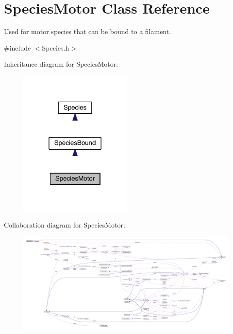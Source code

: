 \hypertarget{classSpeciesMotor}{\section{Species\+Motor Class Reference}
\label{classSpeciesMotor}
}


Used for motor species that can be bound to a filament.  




{\ttfamily \#include $<$Species.\+h$>$}



Inheritance diagram for Species\+Motor\+:\nopagebreak
\begin{figure}[H]
\begin{center}
\leavevmode
\includegraphics[width=160pt]{classSpeciesMotor__inherit__graph}
\end{center}
\end{figure}


Collaboration diagram for Species\+Motor\+:
\nopagebreak
\begin{figure}[H]
\begin{center}
\leavevmode
\includegraphics[width=350pt]{classSpeciesMotor__coll__graph}
\end{center}
\end{figure}
